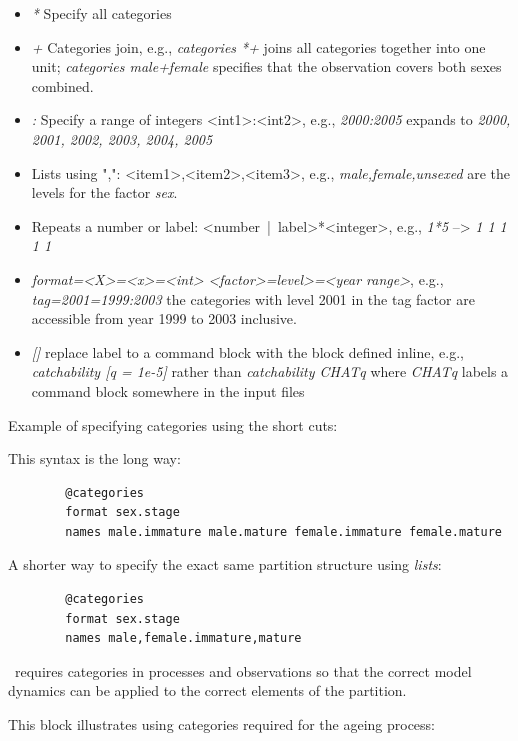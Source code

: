 \begin{itemize}
	\item \textit{*} Specify all categories
	\item \textit{+} Categories join, e.g., \textit{categories *+} joins all categories together into one unit; \textit{categories male+female}
specifies that the observation covers both sexes combined.
    \item \textit{:} Specify a range of integers <int1>:<int2>, e.g., \textit{2000:2005} expands to \textit{2000, 2001, 2002, 2003, 2004, 2005}
    \item Lists using ",": <item1>,<item2>,<item3>, e.g., \textit{male,female,unsexed} are the levels for the factor \textit{sex}.
    \item Repeats a number or label: <number~|~label>*<integer>, e.g., \textit{1*5} --> \textit{1 1 1 1 1}
    \item \textit{format=<X>=<x>=<int>}   
    \textit{<factor>=level>=<year range>}, e.g., \textit{tag=2001=1999:2003} the categories with level 2001 in the tag factor are accessible from year 1999 to 2003 inclusive.
    \item \textit{[]} replace label to a command block with the block defined inline, e.g., \textit{catchability [q = 1e-5]} rather than \textit{catchability CHATq} where \textit{CHATq} labels a command block somewhere in the input files
\end{itemize}


Example of specifying categories using the short cuts:

This syntax is the long way:
{\small{\begin{verbatim}
		@categories
		format sex.stage
		names male.immature male.mature female.immature female.mature
\end{verbatim}}}

A shorter way to specify the exact same partition structure  using \textit{lists}:

{\small{\begin{verbatim}
		@categories
		format sex.stage
		names male,female.immature,mature
\end{verbatim}}}

\CNAME\ requires categories in processes and observations so that the correct model dynamics can be applied to the correct elements of the partition.

This block illustrates using categories required for the ageing process:


